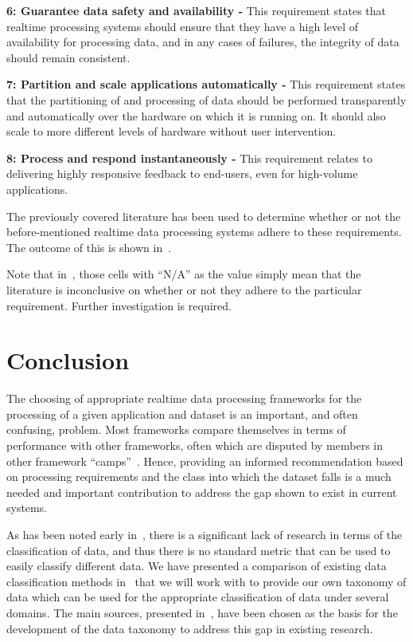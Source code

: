 \documentclass[a4paper,11pt]{article}
\begin{document}
\noindent \textbf{6: Guarantee data safety and availability -} This requirement states that realtime processing systems
should ensure that they have a high level of availability for processing data, and in any cases of failures, the integrity
of data should remain consistent.

\noindent \textbf{7: Partition and scale applications automatically -} This requirement states that the partitioning of
and processing of data should be performed transparently and automatically over the hardware on which it is running on.
It should also scale to more different levels of hardware without user intervention.

\noindent \textbf{8: Process and respond instantaneously -} This requirement relates to delivering highly responsive
feedback to end-users, even for high-volume applications.

The previously covered literature has been used to determine whether or not the before-mentioned realtime data processing
systems adhere to these requirements. The outcome of this is shown in~.

Note that in~, those cells with ``N/A'' as the value simply mean that the literature
is inconclusive on whether or not they adhere to the particular requirement. Further investigation is required.






\section{Conclusion} %
\label{sec:conclusion}

The choosing of appropriate realtime data processing frameworks for the processing of a given application and dataset
is an important, and often confusing, problem. Most frameworks compare themselves in terms of performance with other
frameworks, often which are disputed by members in other framework ``camps''~\cite{web_slideshare_b,web_slideshare_a}.
Hence, providing an informed recommendation based on processing requirements and the class into which the dataset
falls is a much needed and important contribution to address the gap shown to exist in current systems.

As has been noted early in~, there is a significant lack of research in terms of the
classification of data, and thus there is no standard metric that can be used to easily classify different data. We have
presented a comparison of existing data classification methods in~ that we will work with
to provide our own taxonomy of data  which can be used for the appropriate classification of data under several domains.
The main sources, presented in~, have been chosen as the basis for the development of
the data taxonomy to address this gap in existing research.
\end{document}
